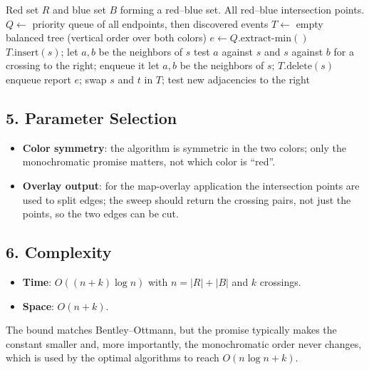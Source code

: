 \begin{algorithm}[htbp]
\caption{Red--Blue Segment Intersection by Sweep}
\label{alg:red_blue_intersection}
\begin{algorithmic}[1]
\Require Red set $R$ and blue set $B$ forming a red--blue set.
\Ensure All red--blue intersection points.
  \State $Q \gets$ priority queue of all endpoints, then discovered events
  \State $T \gets$ empty balanced tree (vertical order over both colors)
    \State $e \gets Q.\text{extract-min}()$
      \State $T.\text{insert}(s)$; let $a,b$ be the neighbors of $s$
      \State test $a$ against $s$ and $s$ against $b$ for a crossing to the right; enqueue it
      \State let $a,b$ be the neighbors of $s$; $T.\text{delete}(s)$
       \State enqueue \EndIf
      \State report $e$; swap $s$ and $t$ in $T$; test new adjacencies to the right
    \EndIf
  \EndWhile
\EndFunction
\end{algorithmic}
\end{algorithm}

\subsection{5. Parameter Selection}

\begin{itemize}
\item \textbf{Color symmetry}: the algorithm is symmetric in the two colors;
  only the monochromatic promise matters, not which color is ``red''.
\item \textbf{Overlay output}: for the map-overlay application the
  intersection points are used to split edges; the sweep should return the
  crossing pairs, not just the points, so the two edges can be cut.
\end{itemize}

\subsection{6. Complexity}

\begin{itemize}
\item \textbf{Time}: $O((n+k)\log n)$ with $n = |R|+|B|$ and $k$ crossings.
\item \textbf{Space}: $O(n+k)$.
\end{itemize}
The bound matches Bentley--Ottmann, but the promise typically makes the
constant smaller and, more importantly, the monochromatic order never
changes, which is used by the optimal algorithms \cite{chazelle1985power,
mairson1988} to reach $O(n\log n + k)$.

